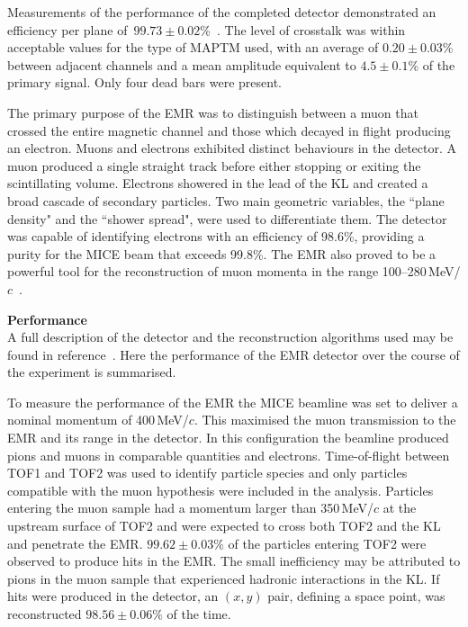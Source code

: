 Measurements of the performance of the completed detector demonstrated
an efficiency per plane
of~$99.73\pm0.02$\%~\cite{2016JInst..11T10007,Drielsma:2017doj}.
The level of crosstalk was within acceptable values for the type of
MAPTM used, with an average of $0.20\pm0.03$\%
between adjacent channels and a mean amplitude
equivalent to $4.5\pm0.1$\% of the primary signal.
Only four dead bars were present.

The primary purpose of the EMR was to distinguish between a muon that crossed  the entire magnetic channel and those which decayed in flight producing an electron.
Muons and electrons exhibited distinct behaviours in the detector.
A muon produced a single straight track before either stopping or
exiting the scintillating volume.
Electrons showered in the lead of the KL and created a broad cascade
of secondary particles.
Two main geometric variables, the ``plane density" and the ``shower spread",
were used to differentiate them.
The detector was capable of identifying electrons with an efficiency
of 98.6\%, providing a purity for the MICE beam that exceeds
99.8\%.
The EMR also proved to be a powerful tool for the reconstruction of
muon momenta in the range
100--280\,MeV/$c$~\cite{2015JInst..10P2012A}.  \\

\newpage

\noindent\textbf{Performance} \\
\noindent
A full description of the detector and the reconstruction algorithms
used may be found in reference~\cite{2015JInst..10P2012A}.
Here the performance of the EMR detector over the course of the
experiment is summarised.

To measure the performance of the EMR the MICE beamline was set to
deliver a nominal momentum of 400\,MeV/$c$. This maximised the muon
transmission to the EMR and its range in the detector.
In this configuration the beamline produced pions and muons in
comparable quantities and electrons.
Time-of-flight between TOF1 and TOF2 was used to identify particle
species and only particles compatible with the muon hypothesis were
included in the analysis.
Particles entering the muon sample had a momentum larger than
350\,MeV/$c$ at the upstream surface of TOF2 and were expected to
cross both TOF2 and the KL and penetrate the EMR.
$99.62\pm0.03\%$ of the particles entering TOF2 were observed to produce
hits in the EMR.
The small inefficiency may be attributed to pions in the muon sample
that experienced hadronic interactions in the KL.
If hits were produced in the detector, an $(x,y)$ pair, defining a
space point, was reconstructed $98.56\pm0.06\%$ of the time.

